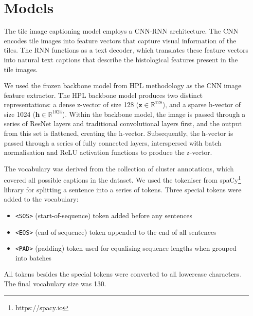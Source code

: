 \documentclass{l4proj}
\begin{document}
\section{Models} \label{sec:caption-model}

The tile image captioning model employs a CNN-RNN architecture. The CNN encodes tile images into feature vectors that capture visual information of the tiles. The RNN functions as a text decoder, which translates these feature vectors into natural text captions that describe the histological features present in the tile images.

We used the frozen backbone model from HPL methodology as the CNN image feature extractor. The HPL backbone model produces two distinct representations: a dense z-vector of size 128 ($\boldsymbol{z} \in \mathbb{R}^{128}$), and a sparse h-vector of size 1024 ($\boldsymbol{h} \in \mathbb{R}^{1024}$). Within the backbone model, the image is passed through a series of ResNet layers and traditional convolutional layers first, and the output from this set is flattened, creating the h-vector. Subsequently, the h-vector is passed through a series of fully connected layers, interspersed with batch normalisation and ReLU activation functions to produce the z-vector.

The vocabulary was derived from the collection of cluster annotations, which covered all possible captions in the dataset. We used the tokeniser from spaCy\footnote{https://spacy.io} library for splitting a sentence into a series of tokens. Three special tokens were added to the vocabulary:
\begin{itemize}
    \item \verb|<SOS>| (start-of-sequence) token added before any sentences
    \item \verb|<EOS>| (end-of-sequence) token appended to the end of all sentences
    \item \verb|<PAD>| (padding) token used for equalising sequence lengths when grouped into batches
\end{itemize}
All tokens besides the special tokens were converted to all lowercase characters. The final vocabulary size was 130.

\end{document}
